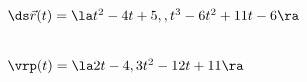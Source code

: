 {$\ds \vec r(t) = \la t^2-4t+5,,t^3-6t^2+11t-6\ra$
}
{
\begin{minipage}{\linewidth}
\\
$\vrp(t) = \la 2t-4,3t^2-12t+11\ra$
\end{minipage}
}

